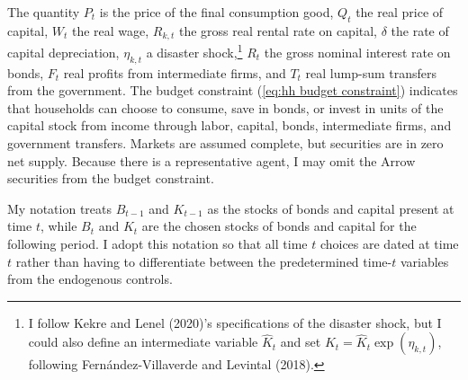 \documentclass[12 pt, oneside]{article}
\theoremstyle{definition}
\theoremstyle{definition}
\theoremstyle{definition}
\begin{document}
The quantity $P_t$ is the price of the final consumption good, $Q_t$ the real price of capital, $W_t$ the real wage, $R_{k, t}$ the gross real rental rate on capital, $\delta$ the rate of capital depreciation, $\eta_{k, t}$ a disaster shock,\footnote{I follow Kekre and Lenel (2020)'s specifications of the disaster shock, but I could also define an intermediate variable $\hat{K}_t$ and set $K_t = \hat{K}_t \exp(\eta_{k, t})$, following Fern{\'a}ndez-Villaverde and Levintal (2018).} $R_t$ the gross nominal interest rate on bonds, $F_t$ real profits from intermediate firms, and $T_t$ real lump-sum transfers from the government. The budget constraint (\ref{eq:hh budget constraint}) indicates that households can choose to consume, save in bonds, or invest in units of the capital stock from income through labor, capital, bonds, intermediate firms, and government transfers. Markets are assumed complete, but securities are in zero net supply. Because there is a representative agent, I may omit the Arrow securities from the budget constraint.

My notation treats $B_{t - 1}$ and $K_{t - 1}$ as the stocks of bonds and capital present at time $t$, while $B_t$ and $K_t$ are the chosen stocks of bonds and capital for the following period. I adopt this notation so that all time $t$ choices are dated at time $t$ rather than having to differentiate between the predetermined time-$t$ variables from the endogenous controls.
\end{document}
